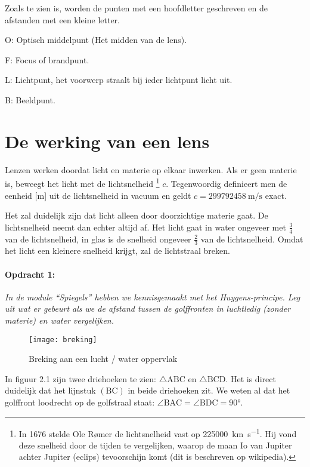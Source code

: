 Zoals te zien is, worden de punten met een hoofdletter geschreven
en de afstanden met een kleine letter.\medskip{}


\qquad{}O: Optisch middelpunt (Het midden van de lens).

\qquad{}F: Focus of brandpunt.

\qquad{}L: Lichtpunt, het voorwerp straalt bij ieder lichtpunt licht
uit.

\qquad{}B: Beeldpunt.


\section{De werking van een lens}

Lenzen werken doordat licht en materie op elkaar inwerken. Als er geen
materie is, beweegt het licht met de lichtsnelheid \footnote{In 1676
stelde Ole Rømer de lichtsnelheid vast op
\SI{225000}{\kilo\meter\per\second}. Hij vond deze snelheid door de
tijden te vergelijken, waarop de maan Io van Jupiter achter Jupiter
(eclips) tevoorschijn komt (dit is beschreven op wikipedia). } $c$.
Tegenwoordig definieert men de eenheid {[}m{]} uit de lichtsnelheid in
vacuum en geldt $c=\SI{299792458}{\meter\per\second}$ exact.

Het zal duidelijk zijn dat licht alleen door doorzichtige materie
gaat. De lichtsnelheid neemt dan echter altijd af. Het licht gaat
in water ongeveer met $\frac{3}{4}$ van de lichtsnelheid, in glas
is de snelheid ongeveer $\frac{2}{3}$ van de lichtsnelheid. Omdat
het licht een kleinere snelheid krijgt, zal de lichtstraal breken.


\paragraph*{Opdracht 1:}

\emph{In de module ``Spiegels'' hebben we kennisgemaakt met het
Huygens-principe. Leg uit wat er gebeurt als we de afstand tussen
de golffronten in luchtledig (zonder materie) en water vergelijken.}

\begin{figure}[H]
\noindent \begin{centering}
\texttt{[image: breking]}
\par\end{centering}

\caption{Breking aan een lucht / water oppervlak}
\end{figure}


In figuur 2.1 zijn twee driehoeken te zien: $\triangle\mathrm{ABC}$
en $\triangle\mathrm{BCD}$. Het is direct duidelijk dat het lijnstuk
$(\mathrm{BC})$ in beide driehoeken zit. We weten al dat het golffront
loodrecht op de golfstraal staat: $\angle\mathrm{BAC}=\angle\mathrm{BDC}=\ang{90}$.



